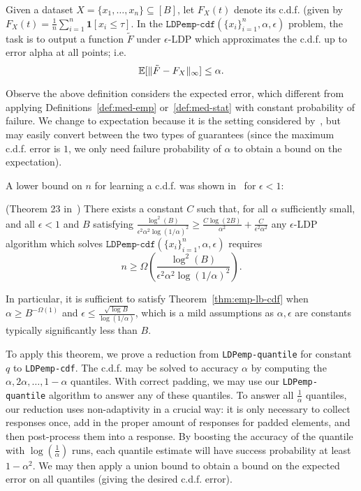 \begin{definition}
    Given a dataset $X = \{x_1, \ldots, x_n\} \subseteq [B]$, let $F_X(t)$ denote its c.d.f. (given by $F_X(t) = \frac{1}{n} \sum_{i=1}^n \textbf{1}[x_i \leq \tau]$.
    In the $\texttt{LDPemp-cdf}(\{x_i\}_{i=1}^n, \alpha, \epsilon)$ problem, the task is to output a function $\tilde{F}$ under $\epsilon$-LDP which approximates the c.d.f. up to error alpha at all points; i.e. 
    \[
        \mathbb{E}[\|\tilde{F} - F_X\|_\infty] \leq \alpha.
    \]
\end{definition}
Observe the above definition considers the expected error, which different from applying Definitions~\ref{def:med-emp} or~\ref{def:med-stat} with constant probability of failure. We change to expectation because it is the setting considered by~\cite{edmondsNU20}, but may easily convert between the two types of guarantees (since the maximum c.d.f. error is $1$, we only need failure probability of $\alpha$ to obtain a bound on the expectation).

A lower bound on $n$ for learning a c.d.f. was shown in~\cite{edmondsNU20} for $\epsilon < 1$:

\begin{theorem}\label{thm:emp-lb-cdf} (Theorem 23 in~\cite{edmondsNU20})
    There exists a constant $C$ such that,
    for all $\alpha$ sufficiently small, and all $\epsilon < 1$ and $B$ satisfying $\frac{\log^2(B)}{ \epsilon^2\alpha^2 \log(1/\alpha)^2} \geq \frac{C \log (2B)}{\alpha^2} + \frac{C}{\epsilon^2 \alpha^2}$ any $\epsilon$-LDP algorithm which solves $\texttt{LDPemp-cdf}(\{x_i\}_{i=1}^n, \alpha, \epsilon)$ requires 
    \[
        n \geq \Omega\left(\frac{\log^2(B)}{\epsilon^2 \alpha^2 \log(1/\alpha)^2}\right).
    \]
\end{theorem}

In particular, it is sufficient to satisfy Theorem~\ref{thm:emp-lb-cdf} when $\alpha \geq B^{-\Omega(1)}$ and $\epsilon \leq \frac{\sqrt{\log B}}{\log(1/\alpha)}$, which is a mild assumptions as $\alpha, \epsilon$ are constants typically significantly less than $B$. 

To apply this theorem, we prove a reduction from \texttt{LDPemp-quantile} for constant $q$ to \texttt{LDPemp-cdf}. The c.d.f. may be solved to accuracy $\alpha$ by computing the $\alpha, 2\alpha, \ldots, 1-\alpha$ quantiles. With correct padding, we may use our \texttt{LDPemp-quantile} algorithm to answer any of these quantiles. To answer all $\frac{1}{\alpha}$ quantiles, our reduction uses non-adaptivity in a crucial way: it is only necessary to collect responses once, add in the proper amount of responses for padded elements, and then post-process them into a response. By boosting the accuracy of the quantile with $\log(\frac{1}{\alpha})$ runs, each quantile estimate will have success probability at least $1-\alpha^2$. We may then apply a union bound to obtain a bound on the expected error on all quantiles (giving the desired c.d.f. error).

